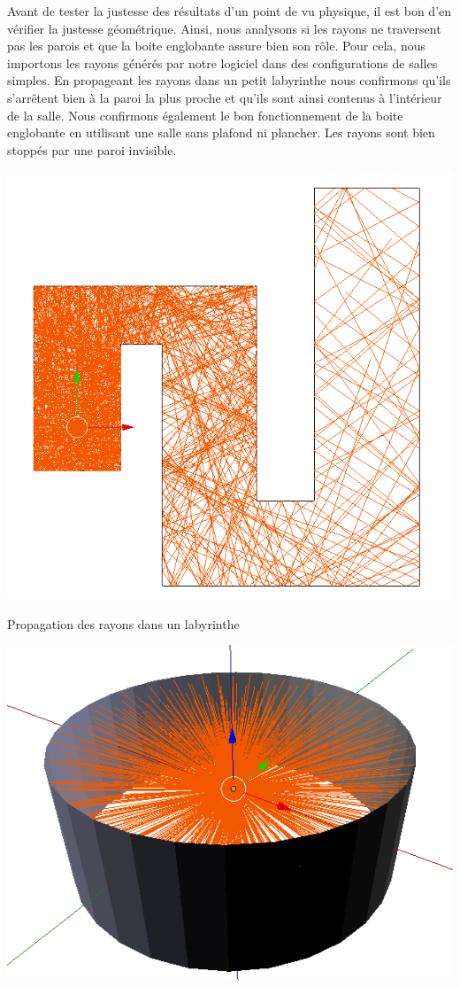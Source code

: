 Avant de tester la justesse des résultats d'un point de vu physique, il est bon d'en vérifier la justesse géométrique. Ainsi, nous analysons si les rayons ne traversent pas les parois et que la boite englobante assure bien son rôle. Pour cela, nous importons les rayons générés par notre logiciel dans des configurations de salles simples. En propageant les rayons dans un petit labyrinthe nous confirmons qu'ils s'arrêtent bien à la paroi la plus proche et qu'ils sont ainsi contenus à l'intérieur de la salle. Nous confirmons également le bon fonctionnement de la boite englobante en utilisant une salle sans plafond ni plancher. Les rayons sont bien stoppés par une paroi invisible.

\begin{figureth}
	\begin{subfigureth}{0.45\textwidth}
		\includegraphics[width=\linewidth]{images/test0}
		\caption{Propagation des rayons dans un labyrinthe}
		\label{test0}
	\end{subfigureth}
	\quad
	\begin{subfigureth}{0.45\textwidth}
		\includegraphics[width=\linewidth]{images/test0bis}

\end{subfigureth}
\end{figureth}
